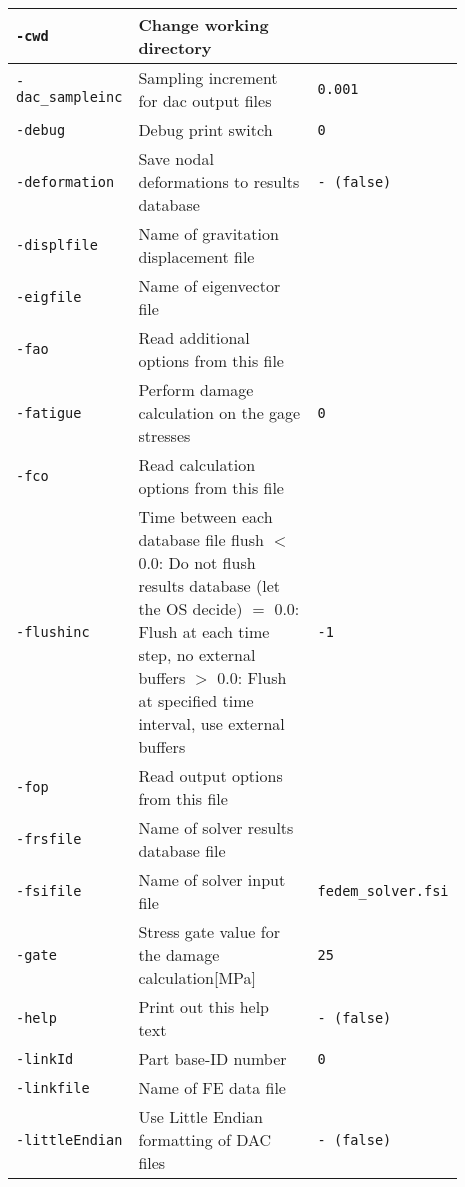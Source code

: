 \begin{threeparttable}[b]
\begin{tabular}{|>{\raggedright} p{0.23\linewidth}| p{0.48\linewidth}| p{0.18\linewidth}|}
  \texttt{-cwd} &   Change working directory &  \\
  \hline
  \texttt{-dac\_sampleinc} &    Sampling increment for dac output files & \texttt{0.001}   \\
  \hline
  \texttt{-debug} &    Debug print switch & \texttt{0}   \\
  \hline
  \texttt{-deformation} &    Save nodal deformations to results database  & \texttt{- (false)}   \\
  \hline
  \texttt{-displfile} &    Name of gravitation displacement file &  \\
  \hline
  \texttt{-eigfile} &    Name of eigenvector file &  \\
  \hline
  \texttt{-fao} &    Read additional options from this file &  \\
  \hline
  \texttt{-fatigue} &    Perform damage calculation on the gage stresses  & \texttt{0}   \\
  \hline
  \texttt{-fco} &       Read calculation options from this file &  \\
  \hline
  \texttt{-flushinc} &    Time between each database file flush\newline
                          $<$ 0.0: Do not flush results database (let the OS decide)\newline
                          $=$ 0.0: Flush at each time step, no external buffers\newline
                          $>$ 0.0: Flush at specified time interval, use external buffers  & \texttt{-1}   \\
  \hline
  \texttt{-fop} &    Read output options from this file &  \\
  \hline
  \texttt{-frsfile} &    Name of solver results database file &  \\
  \hline
  \texttt{-fsifile} &    Name of solver input file  & \scriptsize{\texttt{fedem\_solver.fsi}}   \\
  \hline
  \texttt{-gate} &    Stress gate value for the damage calculation[MPa]  & \texttt{25}   \\
  \hline
  \texttt{-help} &    Print out this help text  & \texttt{- (false)}   \\
  \hline
  \texttt{-linkId} &    Part base-ID number  & \texttt{0}   \\
  \hline
  \texttt{-linkfile} &    Name of FE data file &  \\
  \hline
  \texttt{-littleEndian} &    Use Little Endian formatting of DAC files  & \texttt{- (false)\tnote{1}}   \\

\end{tabular}
\end{threeparttable}
